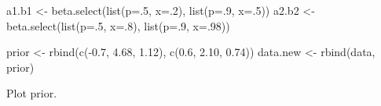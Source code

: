 \documentclass[
]{book}
\newenvironment{Shaded}{\begin{snugshade}}{\end{snugshade}}
\newcommand{\AttributeTok}[1]{\textcolor[rgb]{0.77,0.63,0.00}{#1}}
\newcommand{\DecValTok}[1]{\textcolor[rgb]{0.00,0.00,0.81}{#1}}
\newcommand{\FloatTok}[1]{\textcolor[rgb]{0.00,0.00,0.81}{#1}}
\newcommand{\FunctionTok}[1]{\textcolor[rgb]{0.00,0.00,0.00}{#1}}
\newcommand{\NormalTok}[1]{#1}
\newcommand{\OtherTok}[1]{\textcolor[rgb]{0.56,0.35,0.01}{#1}}
\newcommand{\SpecialCharTok}[1]{\textcolor[rgb]{0.00,0.00,0.00}{#1}}
\begin{document}
\begin{Shaded}
\begin{Highlighting}[]
\NormalTok{a1.b1 }\OtherTok{\textless{}{-}} \FunctionTok{beta.select}\NormalTok{(}\FunctionTok{list}\NormalTok{(}\AttributeTok{p=}\NormalTok{.}\DecValTok{5}\NormalTok{, }\AttributeTok{x=}\NormalTok{.}\DecValTok{2}\NormalTok{),}
                    \FunctionTok{list}\NormalTok{(}\AttributeTok{p=}\NormalTok{.}\DecValTok{9}\NormalTok{, }\AttributeTok{x=}\NormalTok{.}\DecValTok{5}\NormalTok{))}
\NormalTok{a2.b2 }\OtherTok{\textless{}{-}} \FunctionTok{beta.select}\NormalTok{(}\FunctionTok{list}\NormalTok{(}\AttributeTok{p=}\NormalTok{.}\DecValTok{5}\NormalTok{, }\AttributeTok{x=}\NormalTok{.}\DecValTok{8}\NormalTok{),}
                  \FunctionTok{list}\NormalTok{(}\AttributeTok{p=}\NormalTok{.}\DecValTok{9}\NormalTok{, }\AttributeTok{x=}\NormalTok{.}\DecValTok{98}\NormalTok{))}
\end{Highlighting}
\end{Shaded}

\begin{Shaded}
\begin{Highlighting}[]
\NormalTok{prior }\OtherTok{\textless{}{-}} \FunctionTok{rbind}\NormalTok{(}\FunctionTok{c}\NormalTok{(}\SpecialCharTok{{-}}\FloatTok{0.7}\NormalTok{, }\FloatTok{4.68}\NormalTok{, }\FloatTok{1.12}\NormalTok{),}
            \FunctionTok{c}\NormalTok{(}\FloatTok{0.6}\NormalTok{, }\FloatTok{2.10}\NormalTok{, }\FloatTok{0.74}\NormalTok{))}
\NormalTok{data.new }\OtherTok{\textless{}{-}} \FunctionTok{rbind}\NormalTok{(data, prior)}
\end{Highlighting}
\end{Shaded}

Plot prior.
\end{document}
